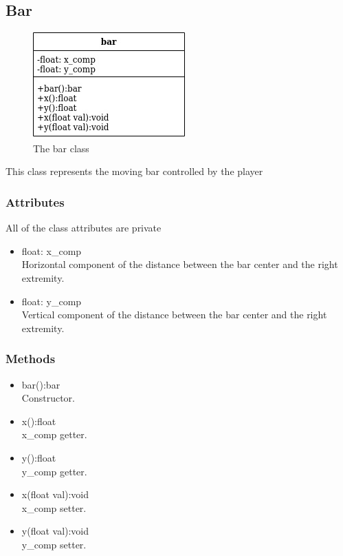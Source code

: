 \documentclass[]{article}
\begin{document}
\subsection{Bar}
\begin{figure}[h!]
    \centering
    \includegraphics[scale=0.5]{bar.jpg}
    \caption{The bar class}
    \label{fig:bar class diagram }
\end{figure}
This class represents the moving bar controlled by the player
\subsubsection{Attributes}
All of the class attributes are private
	\begin{itemize}
		\item float: x\_comp\\Horizontal component of the distance between the bar center and the right extremity.
		\item float: y\_comp\\Vertical component of the distance between the bar center and the right extremity.
	\end{itemize}
\subsubsection{Methods}
	\begin{itemize}
		\item bar():bar\\Constructor.
		\item x():float\\x\_comp getter.
		\item y():float\\y\_comp getter.
		\item x(float val):void\\x\_comp setter.
		\item y(float val):void\\y\_comp setter.
	\end{itemize}
\newpage
\end{document}
